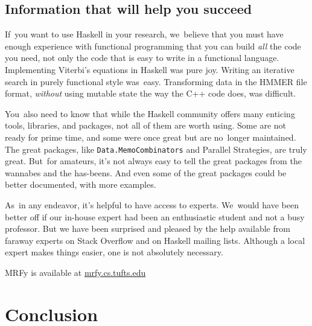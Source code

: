 \documentclass[nonatbib]{sigplanconf}
\newcommand\seclabel[1]{\label{sec:#1}}
\begin{document}
\subsection{Information that will help you succeed}

If~you want to use Haskell in your research, we~believe that you must
have enough experience with functional programming that you can build
\emph{all} the code you need, not only the code that is easy to write
in a functional language.
Implementing Viterbi's equations in Haskell was pure joy.
Writing an iterative search in purely functional style was~easy.
Transforming data in the HMMER file format, \emph{without}
using mutable state the way the C++ code does, was difficult.

\seclabel{penumbra}

You~also need to know that while the Haskell community offers many
enticing tools, libraries, and packages,
not all of them are worth using.
Some are not ready for prime time, and some were once great but are
no~longer maintained.
The great packages, like \texttt{Data.MemoCombinators} and Parallel
Strategies, are truly great.
But~for amateurs, it's not always easy to tell the great packages from the wannabes
and the has-beens.
And even some of the great packages could be better documented, with
more examples.



As~in any endeavor, it's helpful to have access to experts.
We~would have been better off if our in-house expert had been an
enthusiastic student and not a busy professor.
But we have been surprised and pleased by the help available from
faraway experts on Stack Overflow and on Haskell mailing lists.
Although a local expert makes things easier, one is not
 absolutely necessary.

MRFy is available at \url{mrfy.cs.tufts.edu}

\section{Conclusion}
\end{document}
